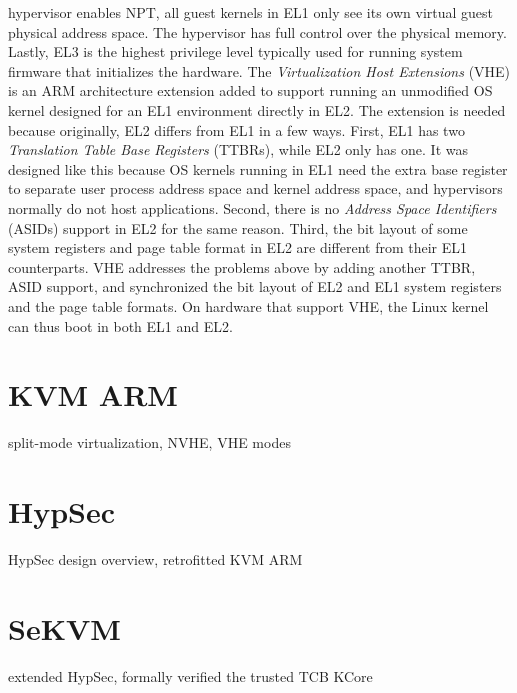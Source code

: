 hypervisor enables NPT, all guest kernels in EL1 only see its own virtual guest
physical address space. The hypervisor has full control over the physical
memory. Lastly, EL3 is the highest privilege level typically used for running
system firmware that initializes the hardware. The
\textit{Virtualization Host Extensions} (VHE) is an ARM architecture extension
added to support running an unmodified OS kernel designed for an EL1
environment directly in EL2. The extension is needed because
originally, EL2 differs from EL1 in a few ways. First, EL1 has two
\textit{Translation Table Base Registers} (TTBRs), while EL2 only has one. It
was designed like this because OS kernels running in EL1 need the extra base
register to separate user process address space and kernel address space, and
hypervisors normally do not host applications. Second, there is no
\textit{Address Space Identifiers} (ASIDs) support in EL2 for the same reason.
Third, the bit layout of some system registers and page table format in EL2 are
different from their EL1 counterparts.
VHE addresses the problems above by adding another TTBR, ASID support, and
synchronized the bit layout of EL2 and EL1 system registers and the page table
formats. On hardware that support VHE, the Linux kernel can thus boot in both
EL1 and EL2.

\section{KVM ARM}

split-mode virtualization, NVHE, VHE modes

\section{HypSec}

HypSec design overview, retrofitted KVM ARM

\section{SeKVM}
\label{sec:sekvmintro}

extended HypSec, formally verified the trusted TCB KCore


